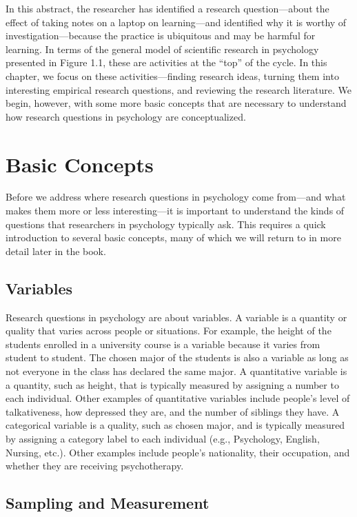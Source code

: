 \documentclass[]{book}
\theoremstyle{definition}
\theoremstyle{definition}
\theoremstyle{remark}
\begin{document}
In this abstract, the researcher has identified a research
question---about the effect of taking notes on a laptop on
learning---and identified why it is worthy of investigation---because
the practice is ubiquitous and may be harmful for learning. In terms of
the general model of scientific research in psychology presented in
Figure 1.1, these are activities at the ``top'' of the cycle. In this
chapter, we focus on these activities---finding research ideas, turning
them into interesting empirical research questions, and reviewing the
research literature. We begin, however, with some more basic concepts
that are necessary to understand how research questions in psychology
are conceptualized.

\section{Basic Concepts}\label{basic-concepts}

Before we address where research questions in psychology come from---and
what makes them more or less interesting---it is important to understand
the kinds of questions that researchers in psychology typically ask.
This requires a quick introduction to several basic concepts, many of
which we will return to in more detail later in the book.

\subsection{Variables}\label{variables}

Research questions in psychology are about variables. A variable is a
quantity or quality that varies across people or situations. For
example, the height of the students enrolled in a university course is a
variable because it varies from student to student. The chosen major of
the students is also a variable as long as not everyone in the class has
declared the same major. A quantitative variable is a quantity, such as
height, that is typically measured by assigning a number to each
individual. Other examples of quantitative variables include people's
level of talkativeness, how depressed they are, and the number of
siblings they have. A categorical variable is a quality, such as chosen
major, and is typically measured by assigning a category label to each
individual (e.g., Psychology, English, Nursing, etc.). Other examples
include people's nationality, their occupation, and whether they are
receiving psychotherapy.

\subsection{Sampling and Measurement}\label{sampling-and-measurement}
\end{document}

